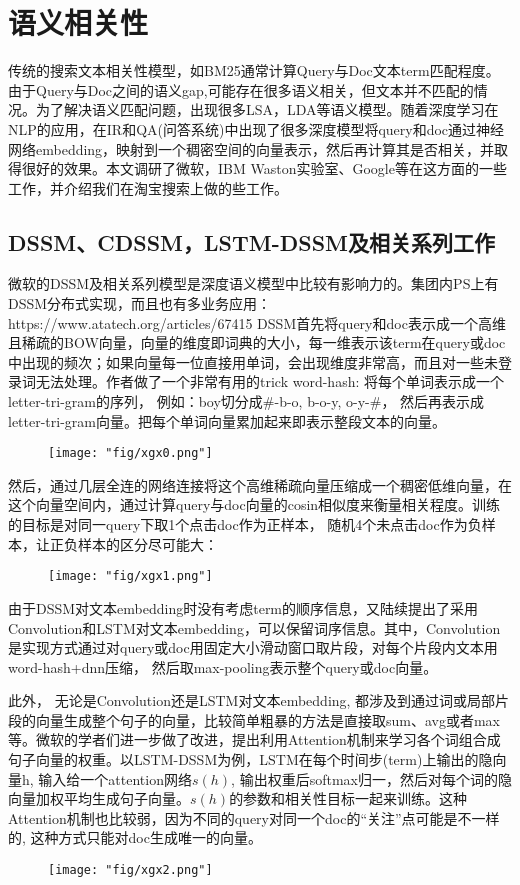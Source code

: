 \section{语义相关性}

传统的搜索文本相关性模型，如BM25通常计算Query与Doc文本term匹配程度。由于Query与Doc之间的语义gap,可能存在很多语义相关，但文本并不匹配的情况。为了解决语义匹配问题，出现很多LSA，LDA等语义模型。随着深度学习在NLP的应用，在IR和QA(问答系统)中出现了很多深度模型将query和doc通过神经网络embedding，映射到一个稠密空间的向量表示，然后再计算其是否相关，并取得很好的效果。本文调研了微软，IBM Waston实验室、Google等在这方面的一些工作，并介绍我们在淘宝搜索上做的些工作。     
\subsection{DSSM、CDSSM，LSTM-DSSM及相关系列工作}
\par 微软的DSSM及相关系列模型是深度语义模型中比较有影响力的。集团内PS上有DSSM分布式实现，而且也有多业务应用：https://www.atatech.org/articles/67415
DSSM首先将query和doc表示成一个高维且稀疏的BOW向量，向量的维度即词典的大小，每一维表示该term在query或doc中出现的频次；如果向量每一位直接用单词，会出现维度非常高，而且对一些未登录词无法处理。作者做了一个非常有用的trick word-hash: 将每个单词表示成一个letter-tri-gram的序列， 例如：boy切分成\#-b-o, b-o-y, o-y-\#， 然后再表示成letter-tri-gram向量。把每个单词向量累加起来即表示整段文本的向量。
\begin{figure}[!h]
	\centering
	\texttt{[image: "fig/xgx0.png"]}
	\caption{}
	\label{fig:xgx0}
\end{figure}

\par 然后，通过几层全连的网络连接将这个高维稀疏向量压缩成一个稠密低维向量，在这个向量空间内，通过计算query与doc向量的cosin相似度来衡量相关程度。训练的目标是对同一query下取1个点击doc作为正样本， 随机4个未点击doc作为负样本，让正负样本的区分尽可能大：
\begin{figure}[!h]
	\centering
	\texttt{[image: "fig/xgx1.png"]}
	\caption{}
	\label{fig:xgx1}
\end{figure}


由于DSSM对文本embedding时没有考虑term的顺序信息，又陆续提出了采用Convolution和LSTM对文本embedding，可以保留词序信息。其中，Convolution是实现方式通过对query或doc用固定大小滑动窗口取片段，对每个片段内文本用word-hash+dnn压缩， 然后取max-pooling表示整个query或doc向量。
\par 此外， 无论是Convolution还是LSTM对文本embedding, 都涉及到通过词或局部片段的向量生成整个句子的向量，比较简单粗暴的方法是直接取sum、avg或者max等。微软的学者们进一步做了改进，提出利用Attention机制来学习各个词组合成句子向量的权重。以LSTM-DSSM为例，LSTM在每个时间步(term)上输出的隐向量h, 输入给一个attention网络$s(h)$, 输出权重后softmax归一，然后对每个词的隐向量加权平均生成句子向量。$s(h)$的参数和相关性目标一起来训练。这种Attention机制也比较弱，因为不同的query对同一个doc的“关注”点可能是不一样的, 这种方式只能对doc生成唯一的向量。
\begin{figure}[!h]
	\centering
	\texttt{[image: "fig/xgx2.png"]}
	\caption{}
	\label{fig:xgx2}
\end{figure}


